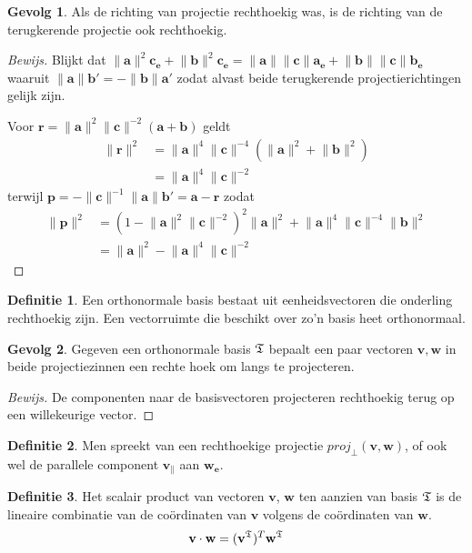 \documentclass{amsart}
\theoremstyle{definition}
\newtheorem{dfn}{Definitie}[section]
\newtheorem{csq}{Gevolg}[section]
\newenvironment{bewijs}{\begin{proof}[Bewijs]}{\end{proof}}
\newcommand{\norm}[1]{\lVert{#1}\rVert}
\newcommand{\vvec}[1][v]{\mathbf{#1}}
\newcommand{\uvec}[1][v]{\vvec[#1]_\mathbf{e}}
\newcommand{\vnorm}[1]{\norm{\vvec[#1]}}
\newcommand{\vecrow}[1][a]{\mathfrak{\MakeUppercase{#1}}}
\newcommand{\cvec}[2]{{#1}^{#2}}
\newcommand{\cvecv}[2][v]{\cvec{\vvec[#1]}{#2}}
\newcommand{\cvecva}[1][a]{\cvecv{\vecrow[#1]}}
\newcommand{\cvecc}[2][a]{\cvecv[#2]{\vecrow[#1]}}
\begin{document}
\begin{csq}
	Als de richting van projectie rechthoekig was, is de richting van de terugkerende projectie ook rechthoekig.
	\begin{bewijs}
		Blijkt dat $\vnorm a^2\uvec[c] + \vnorm b^2\uvec[c] = \vnorm a\vnorm c\uvec[a] + \vnorm b\vnorm c\uvec[b]$ waaruit $\vnorm a\vvec[b'] = -\vnorm b\vvec[a']$ zodat alvast beide terugkerende projectierichtingen gelijk zijn.

		Voor $\vvec[r] = \vnorm a^2\vnorm c^{-2}(\vvec[a]+\vvec[b])$ geldt
		\begin{align*}
			\vnorm r^2
			 & = \vnorm a^4\vnorm c^{-4}\left(\vnorm a^2 + \vnorm b^2\right) \\
			 & = \vnorm a^4\vnorm c^{-2}
		\end{align*}
		terwijl $\vvec[p] = -\vnorm c^{-1}\vnorm a\vvec[b'] = \vvec[a] - \vvec[r]$ zodat
		\begin{align*}
			\vnorm p^2
			 & = (1 - \vnorm a^2\vnorm c^{-2})^2\vnorm a^2 + \vnorm a^4\vnorm c^{-4}\vnorm b^2 \\
			 & = \vnorm a^2 - \vnorm a^4\vnorm c^{-2}
		\end{align*}
	\end{bewijs}
\end{csq}

\begin{dfn}
	Een orthonormale basis bestaat uit eenheidsvectoren die onderling rechthoekig zijn. Een vectorruimte die beschikt over zo'n basis heet orthonormaal.
\end{dfn}

\begin{csq}
	Gegeven een orthonormale basis $\vecrow[t]$ bepaalt een paar vectoren $\vvec, \vvec[w]$ in beide projectiezinnen een rechte hoek om langs te projecteren.
	\begin{bewijs}
		De componenten naar de basisvectoren projecteren rechthoekig terug op een willekeurige vector.
	\end{bewijs}
\end{csq}

\begin{dfn}
	Men spreekt van een rechthoekige projectie $proj_\perp(\vvec, \vvec[w])$, of ook wel de parallele component $\vvec_\|$ aan $\uvec[w]$.
\end{dfn}

\begin{dfn}
	Het scalair product van vectoren $\vvec$, $\vvec[w]$ ten aanzien van basis $\vecrow[t]$ is de lineaire combinatie van de coördinaten van $\vvec$ volgens de coördinaten van $\vvec[w]$.
	\begin{equation*}
		\vvec \cdot \vvec[w] = (\cvecva[t])^T \cvecc[t]{w}
	\end{equation*}
\end{dfn}
\end{document}

